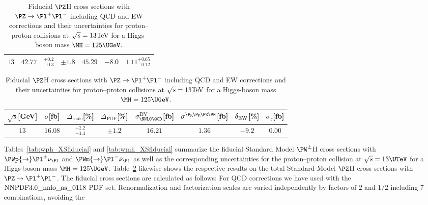 \begin{table}
\begin{center}
\begin{small}
\begin{tabular}{ccccccc}
$13$ & $ 42.77 $ & ${}_{-0.3}^{+ 0.2}$ & $\pm 1.8$ & $45.29$ & $-8.0$ & $1.11^{+0.65}_{-0.12}$
\\
\hline
\end{tabular}%
\end{small}%
\end{center}%
\vspace{2em}
\caption{Fiducial $\PZ$H cross sections with $\PZ\to\Pl^+\Pl^-$ including QCD and EW corrections
and their uncertainties for proton--proton collisions at 
$\sqrt{s}=13\rm{TeV}$ for a Higgs-boson mass $\MH=125\UGeV$.}
\label{tab:zllh_XSfiducial}
\begin{center}%
\begin{small}%
\begin{tabular}{cccccccc}%
\hline
$\sqrt{s}$[GeV] & $\sigma$[fb] & $\Delta_{\mathrm{scale}}$[\%] & $\Delta_{\mathrm{PDF}}$[\%] & $\sigma_{\NNLO \QCD}^{\DY}$[fb] & 
$\sigma^{\Pg\Pg\PZ\PH}$[fb] & $\delta_{\mathrm{EW}}$[\%] & $\sigma_{\gamma}$[fb]
\\
\hline
$13$ & $16.08$ & ${}_{-1.4}^{+ 2.2}$ &  $\pm 1.2$ & $16.21$ & $1.36$ & $-9.2$ & $0.00$
\\
\hline
\end{tabular}%
\end{small}%
\end{center}%
\end{table}
%
Tables~\ref{tab:wph_XSfiducial} and \ref{tab:wmh_XSfiducial} summarize the fiducial 
Standard Model $\PW^\pm$H cross sections with $\PWp{\to}\Pl^+\nu_{\Pl}$
and $\PWm{\to}\Pl^-\bar\nu_{\Pl}$
as well as the corresponding uncertainties
for the proton--proton collision at $\sqrt{s}=13\UTeV$
for a Higgs-boson mass $\MH=125\UGeV$.
Table~\ref{tab:zllh_XSfiducial} likewise shows
the respective results on the total
Standard Model $\PZ$H cross sections with $\PZ\to\Pl^+\Pl^-$.
The fiducial cross sections are calculated as follows: For QCD corrections we have used
\vhnnlo{} with the $\rm{NNPDF3.0\_nnlo\_as\_0118}$ PDF set. Renormalization and factorization scales
are varied independently by factors of $2$ and $1/2$ including $7$ combinations, avoiding the
